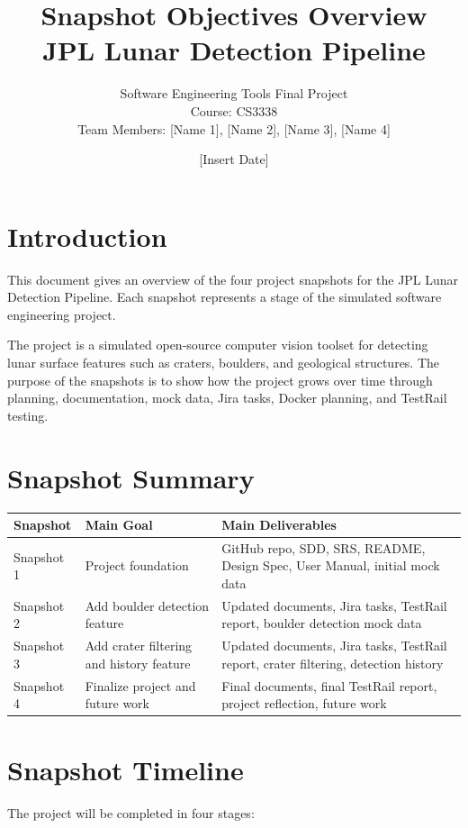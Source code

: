 \documentclass[12pt]{article}
\title{
    \textbf{Snapshot Objectives Overview} \\
    JPL Lunar Detection Pipeline
}
\author{
    Software Engineering Tools Final Project \\
    Course: CS3338 \\
    Team Members: [Name 1], [Name 2], [Name 3], [Name 4]
}
\date{[Insert Date]}
\begin{document}
\maketitle
\newpage

\tableofcontents
\newpage

\section{Introduction}

This document gives an overview of the four project snapshots for the JPL Lunar Detection Pipeline. Each snapshot represents a stage of the simulated software engineering project.

The project is a simulated open-source computer vision toolset for detecting lunar surface features such as craters, boulders, and geological structures. The purpose of the snapshots is to show how the project grows over time through planning, documentation, mock data, Jira tasks, Docker planning, and TestRail testing.

\section{Snapshot Summary}

\begin{longtable}{|p{1.5in}|p{2in}|p{2.5in}|}
\hline
\textbf{Snapshot} & \textbf{Main Goal} & \textbf{Main Deliverables} \\
\hline
Snapshot 1 & Project foundation & GitHub repo, SDD, SRS, README, Design Spec, User Manual, initial mock data \\
\hline
Snapshot 2 & Add boulder detection feature & Updated documents, Jira tasks, TestRail report, boulder detection mock data \\
\hline
Snapshot 3 & Add crater filtering and history feature & Updated documents, Jira tasks, TestRail report, crater filtering, detection history \\
\hline
Snapshot 4 & Finalize project and future work & Final documents, final TestRail report, project reflection, future work \\
\hline
\end{longtable}

\section{Snapshot Timeline}

The project will be completed in four stages:
\end{document}
